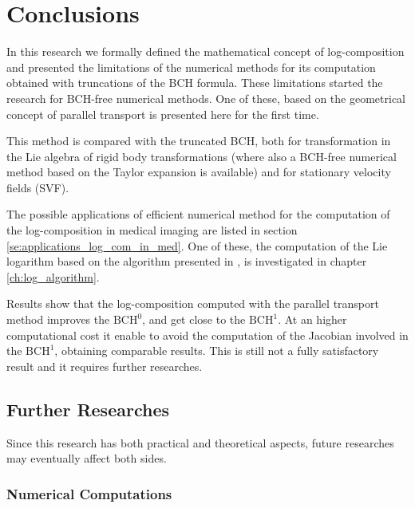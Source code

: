 
\chapter{Conclusions}\label{se:conclusions}

In this research we formally defined the mathematical concept of log-composition and presented the limitations of the numerical methods for its computation obtained with truncations of the BCH formula. These limitations started the research for BCH-free numerical methods. 
One of these, based on the geometrical concept of parallel transport is presented here for the first time.

This method is compared with the truncated BCH, both for transformation in the Lie algebra of rigid body transformations (where also a BCH-free numerical method based on the Taylor expansion is available) and for stationary velocity fields (SVF).

The possible applications of efficient numerical method for the computation of the log-composition in medical imaging are listed in section \ref{se:applications_log_com_in_med}. One of these, the computation of the Lie logarithm based on the algorithm presented in \cite{bossa2008new}, is investigated in chapter \ref{ch:log_algorithm}.

Results show that the log-composition computed with the parallel transport method improves the $\text{BCH}^0$, and get close to the $\text{BCH}^1$. At an higher computational cost it enable to avoid the computation of the Jacobian involved in the $\text{BCH}^1$, obtaining comparable results. This is still not a fully satisfactory result and it requires further researches.


\section{Further Researches}\label{se:further_research}

Since this research has both practical and theoretical aspects, future researches may eventually affect both sides.

\subsection{Numerical Computations} 


